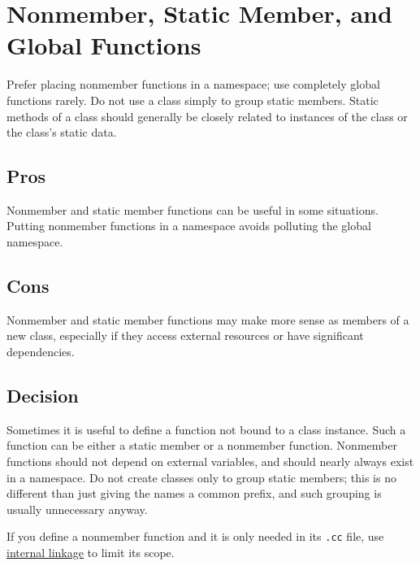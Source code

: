 
\section{Nonmember, Static Member, and Global Functions}\label{sec:nonmember-static-member-and-global-functions}
Prefer placing nonmember functions in a namespace; use completely global functions rarely. Do not use a class simply to group static members. Static methods of a class should generally be closely related to instances of the class or the class's static data.

\subsection{Pros}
Nonmember and static member functions can be useful in some situations. Putting nonmember functions in a namespace avoids polluting the global namespace.

\subsection{Cons}
Nonmember and static member functions may make more sense as members of a new class, especially if they access external resources or have significant dependencies.

\subsection{Decision}
Sometimes it is useful to define a function not bound to a class instance. Such a function can be either a static member or a nonmember function. Nonmember functions should not depend on external variables, and should nearly always exist in a namespace. Do not create classes only to group static members; this is no different than just giving the names a common prefix, and such grouping is usually unnecessary anyway.

If you define a nonmember function and it is only needed in its \texttt{.cc} file, use \hyperref[sec:internal-linkage]{internal linkage} to limit its scope.
